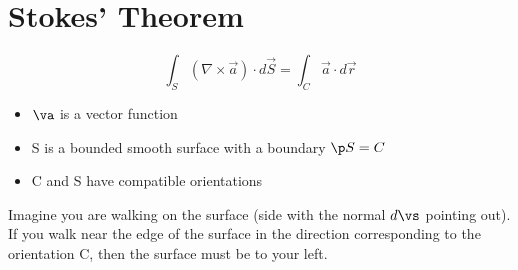 \documentclass[a4paper, 11pt, normalem]{report}
\begin{document}
\section{Stokes' Theorem}
\begin{equation*}
    \int_S (\nabla \times \vec{a})\cdot d\vec{S} = \int_C \vec{a} \cdot d\vec{r}
\end{equation*}
\begin{itemize}
    \item $\va$ is a vector function
    \item S is a bounded smooth surface with a boundary $\p S = C$
    \item C and S have compatible orientations
\end{itemize}
Imagine you are walking on the surface (side with the normal $d\vs$ pointing out).
If you walk near the edge of the surface in the direction corresponding to the orientation C, then the surface must be to your left.
\end{document}
